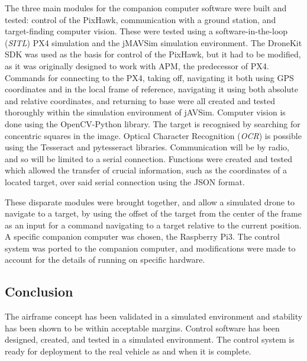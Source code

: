 \documentclass[11pt]{article}
\begin{document}
The three main modules for the companion computer software were built and tested: control of the PixHawk, communication with a ground station, and target-finding computer vision.
These were tested using a software-in-the-loop (\emph{SITL}) PX4 simulation and the jMAVSim simulation environment. The DroneKit SDK was used as the basis for control of the PixHawk, but it had to be modified, as it was originally designed to work with APM, the predecessor of PX4\cite{dronekit}. Commands for connecting to the PX4, taking off, navigating it both using GPS coordinates and in the local frame of reference, navigating it using both absolute and relative coordinates, and returning to base were all created and tested thoroughly within the simulation environment of jAVSim. Computer vision is done using the OpenCV-Python library. The target is recognised by searching for concentric squares in the image. Optical Character Recognition (\emph{OCR}) is possible using the Tesseract and pytesseract libraries. Communication will be by radio, and so will be limited to a serial connection. Functions were created and tested which allowed the transfer of crucial information, such as the coordinates of a located target, over said serial connection using the JSON format.

These disparate modules were brought together, and allow a simulated drone to navigate to a target, by using the offset of the target from the center of the frame as an input for a command navigating to a target relative to the current position. A specific companion computer was chosen, the Raspberry Pi3. The control system was ported to the companion computer, and modifications were made to account for the details of running on specific hardware.

\subsection*{Conclusion}
The airframe concept has been validated in a simulated environment and stability has been shown to be within acceptable margins. Control software has been designed, created, and tested in a simulated environment. The control system is ready for deployment to the real vehicle as and when it is complete.
\end{document}
